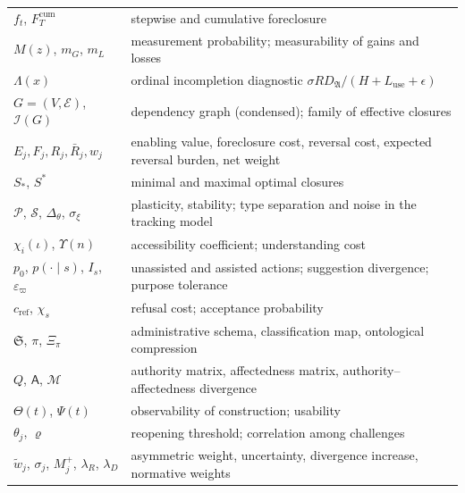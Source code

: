 \begin{center}
\begin{tabular}{@{}ll@{}}
$f_t$, $F^{\mathrm{cum}}_T$ & stepwise and cumulative foreclosure\\
$M(z)$, $m_G$, $m_L$ & measurement probability; measurability of gains and losses\\
$\Lambda(x)$ & ordinal incompletion diagnostic $\sigma RD_{\mathfrak{A}}/(H+L_{\mathrm{use}}+\epsilon)$\\
$G=(V,\mathcal{E})$, $\mathcal{I}(G)$ & dependency graph (condensed); family of effective closures\\
$E_j,F_j,R_j,\bar R_j,w_j$ & enabling value, foreclosure cost, reversal cost, expected reversal burden, net weight\\
$S_\ast$, $S^\ast$ & minimal and maximal optimal closures\\
$\mathcal{P}$, $\mathcal{S}$, $\Delta_\theta$, $\sigma_\xi$ & plasticity, stability; type separation and noise in the tracking model\\
$\chi_i(\iota)$, $\Upsilon(n)$ & accessibility coefficient; understanding cost\\
$p_0$, $p(\cdot\mid s)$, $I_s$, $\varepsilon_\varpi$ & unassisted and assisted actions; suggestion divergence; purpose tolerance\\
$c_{\mathrm{ref}}$, $\chi_s$ & refusal cost; acceptance probability\\
$\mathfrak{S}$, $\pi$, $\Xi_\pi$ & administrative schema, classification map, ontological compression\\
$Q$, $\mathsf{A}$, $\mathcal{M}$ & authority matrix, affectedness matrix, authority--affectedness divergence\\
$\Theta(t)$, $\Psi(t)$ & observability of construction; usability\\
$\theta_j$, $\varrho$ & reopening threshold; correlation among challenges\\
$\tilde w_j$, $\sigma_j$, $M_j^+$, $\lambda_R$, $\lambda_D$ & asymmetric weight, uncertainty, divergence increase, normative weights\\
\bottomrule
\end{tabular}
\end{center}
